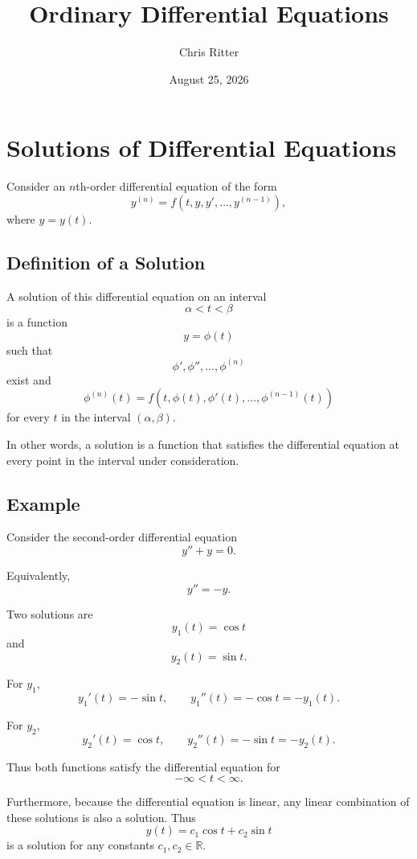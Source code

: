 \documentclass[11pt]{article}
\title{Ordinary Differential Equations}
\author{Chris Ritter}
\date{August 25, 2026}
\begin{document}
\maketitle
\tableofcontents
\newpage

\section{Solutions of Differential Equations}

Consider an \(n\)th-order differential equation of the form
\[
y^{(n)}
=
f\left(t,y,y',\ldots,y^{(n-1)}\right),
\]
where \(y=y(t)\).

\subsection{Definition of a Solution}

A solution of this differential equation on an interval
\[
\alpha < t < \beta
\]
is a function
\[
y=\phi(t)
\]
such that
\[
\phi',\phi'',\ldots,\phi^{(n)}
\]
exist and
\[
\phi^{(n)}(t)
=
f\left(
t,\phi(t),\phi'(t),\ldots,\phi^{(n-1)}(t)
\right)
\]
for every \(t\) in the interval \((\alpha,\beta)\).

In other words, a solution is a function that satisfies the differential equation at every point in the interval under consideration.

\subsection{Example}

Consider the second-order differential equation
\[
y''+y=0.
\]

Equivalently,
\[
y''=-y.
\]

Two solutions are
\[
y_1(t)=\cos t
\]
and
\[
y_2(t)=\sin t.
\]

For \(y_1\),
\[
y_1'(t)=-\sin t,
\qquad
y_1''(t)=-\cos t=-y_1(t).
\]

For \(y_2\),
\[
y_2'(t)=\cos t,
\qquad
y_2''(t)=-\sin t=-y_2(t).
\]

Thus both functions satisfy the differential equation for
\[
-\infty<t<\infty.
\]

Furthermore, because the differential equation is linear, any linear combination of these solutions is also a solution. Thus
\[
y(t)=c_1\cos t+c_2\sin t
\]
is a solution for any constants \(c_1,c_2\in\mathbb{R}\).
\end{document}
